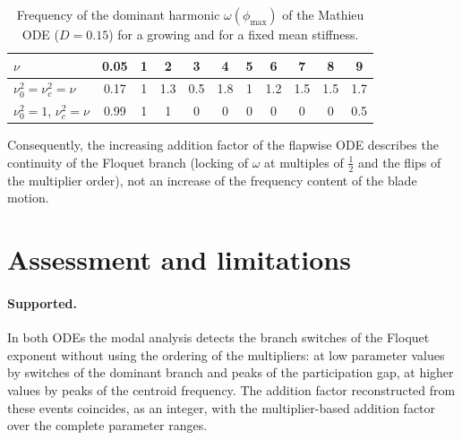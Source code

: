 \documentclass[11pt,a4paper]{article}
\begin{document}
\begin{table}[htbp]
  \centering
  \caption{Frequency of the dominant harmonic $\omega(\phi_\text{max})$ of the Mathieu
  ODE ($D = 0.15$) for a growing and for a fixed mean stiffness.}
  \label{tab:control}
  \begin{tabular}{lcccccccccc}
    \toprule
    $\nu$ & 0.05 & 1 & 2 & 3 & 4 & 5 & 6 & 7 & 8 & 9 \\
    \midrule
    $\nu_0^2 = \nu_c^2 = \nu$         & 0.17 & 1 & 1.3 & 0.5 & 1.8 & 1 & 1.2 & 1.5 & 1.5 & 1.7 \\
    $\nu_0^2 = 1$, $\nu_c^2 = \nu$    & 0.99 & 1 & 1   & 0   & 0   & 0 & 0   & 0   & 0   & 0.5 \\
    \bottomrule
  \end{tabular}
\end{table}

Consequently, the increasing addition factor of the flapwise ODE describes the continuity
of the Floquet branch (locking of $\omega$ at multiples of $\tfrac{1}{2}$ and the flips of
the multiplier order), not an increase of the frequency content of the blade motion.

\section{Assessment and limitations}

\paragraph{Supported.} In both ODEs the modal analysis detects the branch switches of the
Floquet exponent without using the ordering of the multipliers: at low parameter values
by switches of the dominant branch and peaks of the participation gap, at higher values
by peaks of the centroid frequency. The addition factor reconstructed from these events
coincides, as an integer, with the multiplier-based addition factor over the complete
parameter ranges.
\end{document}
